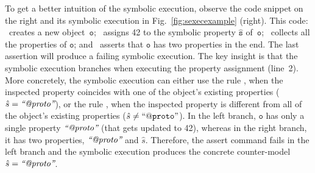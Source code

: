 To get a better intuition of the symbolic execution, observe the code snippet on the right and its symbolic execution in Fig.~\ref{fig:sexecexample} (right). 
This code: 
        ~creates a new object~$\mathtt{o}$;
	~assigns 42 to the symbolic property $\hat{\mathtt{s}}$ of~$\mathtt{o}$; 
	~collects all the properties of $\mathtt{o}$; and
	~asserts that $\mathtt{o}$ has two properties in the end. 
	     The last assertion will produce a failing symbolic execution.
%
%
The key insight is that the symbolic execution branches when executing the property assignment (line~2).
% 
More concretely, the symbolic execution can either use the rule , when 
the inspected property coincides with one of the object's existing properties ({\small$\hat{s} = \text{{\it ``@proto''}}$}), 
or the rule , when the inspected property is different from all of the 
object's existing properties ({\small $\hat{s} \neq \mathtt{``@proto"}$}). 
%
In the left branch, $\mathtt{o}$ has only a single property $\text{{\it ``@proto''}}$ (that gets updated to 42), whereas
in the right branch, it has two properties, $\text{{\it ``@proto''}}$ and $\hat{s}$. 
%
Therefore, the assert command fails in the left branch and the symbolic execution  produces the concrete counter-model $\hat{s} = \text{{\it ``@proto''}}$.

